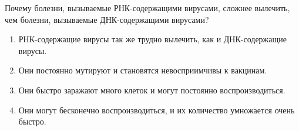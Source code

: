 
Почему болезни, вызываемые РНК-содержащими вирусами, сложнее вылечить, чем болезни, вызываемые ДНК-содержащими вирусами?

\begin{enumerate}
    \item РНК-содержащие вирусы так же трудно вылечить, как и ДНК-содержащие вирусы.
    \item Они постоянно мутируют и становятся невосприимчивы к вакцинам.
    \item Они быстро заражают много клеток и могут постоянно воспроизводиться.
    \item Они могут бесконечно воспроизводиться, и их количество умножается очень быстро.
\end{enumerate}

\explanationSection

